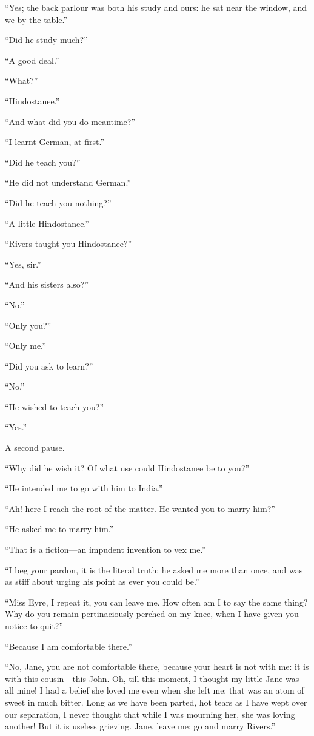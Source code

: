 \enquote{Yes; the back parlour was both his study and ours: he sat near
	the window, and we by the table.}

\enquote{Did he study much?}

\enquote{A good deal.}

\enquote{What?}

\enquote{Hindostanee.}

\enquote{And what did you do meantime?}

\enquote{I learnt German, at first.}

\enquote{Did he teach you?}

\enquote{He did not understand German.}

\enquote{Did he teach you nothing?}

\enquote{A little Hindostanee.}

\enquote{Rivers taught you Hindostanee?}

\enquote{Yes, sir.}

\enquote{And his sisters also?}

\enquote{No.}

\enquote{Only you?}

\enquote{Only me.}

\enquote{Did you ask to learn?}

\enquote{No.}

\enquote{He wished to teach you?}

\enquote{Yes.}

A second pause.

\enquote{Why did he wish it? Of what use could Hindostanee be to you?}

\enquote{He intended me to go with him to India.}

\enquote{Ah! here I reach the root of the matter. He wanted you to
	marry him?}

\enquote{He asked me to marry him.}

\enquote{That is a fiction---an impudent invention to vex me.}

\enquote{I beg your pardon, it is the literal truth: he asked me more
	than once, and was as stiff about urging his point as ever you could
	be.}

\enquote{Miss Eyre, I repeat it, you can leave me. How often am I to
	say the same thing? Why do you remain pertinaciously perched on my
	knee, when I have given you notice to quit?}

\enquote{Because I am comfortable there.}

\enquote{No, Jane, you are not comfortable there, because your heart is
	not with me: it is with this cousin---this \St{} John. Oh, till this
	moment, I thought my little Jane was all mine! I had a belief she loved
	me even when she left me: that was an atom of sweet in much bitter.
	Long as we have been parted, hot tears as I have wept over our
	separation, I never thought that while I was mourning her, she was
	loving another! But it is useless grieving. Jane, leave me: go and
	marry Rivers.}

